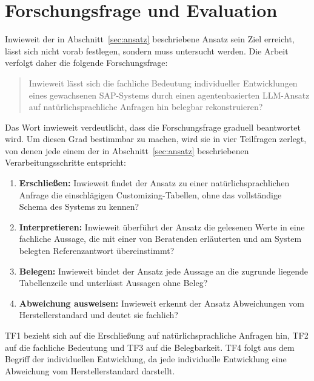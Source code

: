 \section{Forschungsfrage und Evaluation}
\label{sec:forschungsfrage}
 
Inwieweit der in Abschnitt~\ref{sec:ansatz} beschriebene Ansatz sein Ziel erreicht, lässt sich nicht vorab festlegen, sondern muss untersucht werden. Die Arbeit verfolgt daher die folgende Forschungsfrage:
 
\begin{quote}
\glqq Inwieweit lässt sich die fachliche Bedeutung individueller Entwicklungen eines gewachsenen SAP-Systems durch einen agentenbasierten LLM-Ansatz auf natürlichsprachliche Anfragen hin belegbar rekonstruieren?\grqq
\end{quote}
 
Das Wort \glqq inwieweit\grqq{} verdeutlicht, dass die Forschungsfrage graduell beantwortet wird. Um diesen Grad bestimmbar zu machen, wird sie in vier Teilfragen zerlegt, von denen jede einem der in Abschnitt~\ref{sec:ansatz} beschriebenen Verarbeitungsschritte entspricht:
\begin{enumerate}
	\item[\textbf{TF1}] \textbf{Erschließen:} Inwieweit findet der Ansatz zu einer natürlichsprachlichen Anfrage die einschlägigen Customizing-Tabellen, ohne das vollständige Schema des Systems zu kennen?
	\item[\textbf{TF2}] \textbf{Interpretieren:} Inwieweit überführt der Ansatz die gelesenen Werte in eine fachliche Aussage, die mit einer von Beratenden erläuterten und am System belegten Referenzantwort übereinstimmt?
	\item[\textbf{TF3}] \textbf{Belegen:} Inwieweit bindet der Ansatz jede Aussage an die zugrunde liegende Tabellenzeile und unterlässt Aussagen ohne Beleg?
	\item[\textbf{TF4}] \textbf{Abweichung ausweisen:} Inwieweit erkennt der Ansatz Abweichungen vom Herstellerstandard und deutet sie fachlich?
\end{enumerate}
TF1 bezieht sich auf die Erschließung auf natürlichsprachliche Anfragen hin, TF2 auf die fachliche Bedeutung und TF3 auf die Belegbarkeit. TF4 folgt aus dem Begriff der individuellen Entwicklung, da jede individuelle Entwicklung eine Abweichung vom Herstellerstandard darstellt.

